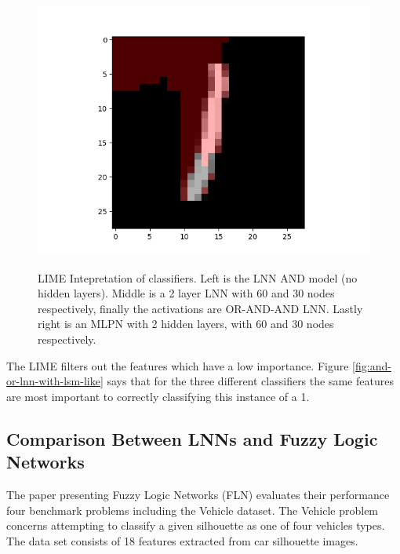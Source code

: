\begin{figure}[H]
\begin{minipage}[b]{0.33\textwidth}
		\includegraphics[width=\textwidth]{LIME/MLPN.png}
		\label{}
	\end{minipage}
	\caption{LIME Intepretation of classifiers. Left is the LNN AND model (no hidden layers). Middle is a 2 layer LNN with 60 and 30 nodes respectively, finally the activations are OR-AND-AND LNN. Lastly right is an MLPN with 2 hidden layers, with 60 and 30 nodes respectively.}
	\label{fig:lime-comp}
\end{figure}

The LIME filters out the features which have a low importance. Figure \ref{fig:and-or-lnn-with-lsm-like} says that for the three different classifiers the same features are most important to correctly classifying this instance of a 1. 

\subsection{Comparison Between LNNs and Fuzzy Logic Networks}
The paper presenting Fuzzy Logic Networks (FLN) evaluates their performance four benchmark problems including the Vehicle \cite{Lichman:2013} dataset. The Vehicle problem concerns attempting to classify a given silhouette as one of four vehicles types. The data set consists of 18 features extracted from car silhouette images.\\

